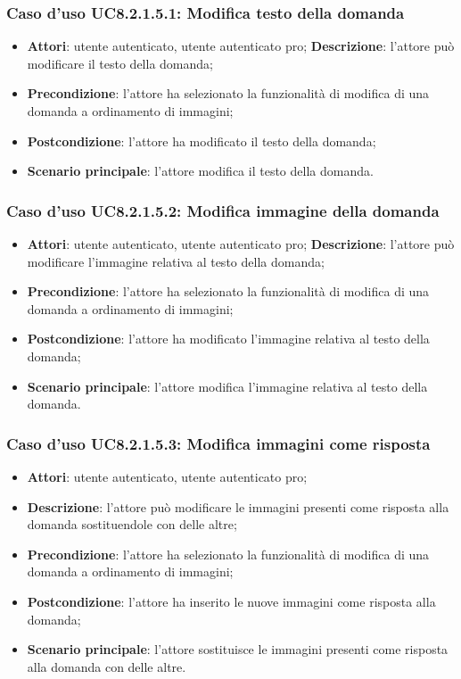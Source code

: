 \subsubsection{Caso d'uso UC8.2.1.5.1: Modifica testo della domanda}
\begin{itemize}
	\item\textbf{Attori}: utente autenticato, utente autenticato pro;
	\textbf{Descrizione}: l'attore può modificare il testo della domanda;
		\item
			\textbf{Precondizione}: l'attore ha selezionato la funzionalità di modifica di una domanda a ordinamento di immagini; 
		\item
			\textbf{Postcondizione}: l'attore ha modificato il testo della domanda;
		\item
			\textbf{Scenario principale}: l'attore modifica il testo della domanda.	
	\end{itemize}

\subsubsection{Caso d'uso UC8.2.1.5.2: Modifica immagine della domanda}
\begin{itemize}
	\item\textbf{Attori}: utente autenticato, utente autenticato pro;
	\textbf{Descrizione}: l'attore può modificare l'immagine relativa al testo della domanda;
		\item
			\textbf{Precondizione}: l'attore ha selezionato la funzionalità di modifica di una domanda a ordinamento di immagini; 
		\item
			\textbf{Postcondizione}: l'attore ha modificato l'immagine relativa al testo della domanda;
		\item
			\textbf{Scenario principale}: l'attore modifica l'immagine relativa al testo della domanda. 	
	\end{itemize}

\subsubsection{Caso d'uso UC8.2.1.5.3: Modifica immagini come risposta}
\begin{itemize}
	\item\textbf{Attori}: utente autenticato, utente autenticato pro;
	\item\textbf{Descrizione}: l'attore può modificare le immagini presenti come risposta alla domanda sostituendole con delle altre;
	\item\textbf{Precondizione}: l'attore ha selezionato la funzionalità di modifica di una domanda a ordinamento di immagini;
	\item \textbf{Postcondizione}: l'attore ha inserito le nuove immagini come risposta alla domanda;
	\item\textbf{Scenario principale}: l'attore sostituisce le immagini presenti come risposta alla domanda con delle altre.
\end{itemize}

